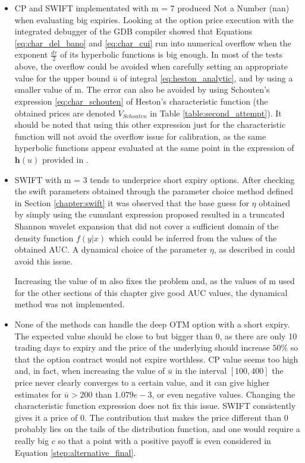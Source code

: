 \documentclass[12,twoside]{mammeTFM}
\theoremstyle{definition}
\theoremstyle{remark}
\begin{document}
\begin{itemize}
\item CP and SWIFT implementated with m = 7 produced Not a Number (nan) when evaluating big expiries. Looking at the option price execution with the integrated debugger of the GDB compiler \cite{wil16} showed that Equations \ref{eq:char_del_bano} and \ref{eq:char_cui} run into numerical overflow when the exponent $\frac{d \tau}{2}$ of its hyperbolic functions is big enough. In most of the tests above, the overflow could be avoided when carefully setting an appropriate value for the upper bound $\overline{u}$ of integral \ref{eq:heston_analytic}, and by using a smaller value of m. The error can also be avoided by using Schouten's expression \ref{eq:char_schouten} of Heston's characteristic function (the obtained prices are denoted $V_{Schouten}$ in Table \ref{table:second_attempt}). It should be noted that using this other expression just for the characteristic function will not avoid the overflow issue for calibration, as the same hyperbolic functions appear evaluated at the same point in the expression of $\boldsymbol{h}(u)$ provided in \cite{cui17}.

\item SWIFT with m = 3 tends to underprice short expiry options. After checking the swift parameters obtained through the parameter choice method defined in Section \ref{chapter:swift} it was observed that the base guess for $\eta$ obtained by simply using the cumulant expression proposed resulted in a truncated Shannon wavelet expansion that did not cover a sufficient domain of the density function $f(y | x)$ which could be inferred from the values of the obtained AUC. A dynamical choice of the parameter $\eta$, as described in \cite{Ortiz-Gracia2016} could avoid this issue.

Increasing the value of m also fixes the problem and, as the values of m used for the other sections of this chapter give good AUC values, the dynamical method was not implemented.

\item None of the methods can handle the deep OTM option with a short expiry. The expected value should be close to but bigger than 0, as there are only 10 trading days to expiry and the price of the underlying should increase $50\%$ so that the option contract would not expire worthless. CP value seems too high and, in fact, when increasing the value of $\overline{u}$ in the interval $[100, 400]$ the price never clearly converges to a certain value, and it can give higher estimates for $\overline{u} > 200$ than $1.079e-3$, or even negative values. Changing the characteristic function expression does not fix this issue. SWIFT consistently gives it a price of 0. The contribution that makes the price different than 0 probably lies on the tails of the distribution function, and one would require a really big $c$ so that a point with a positive payoff is even considered in Equation \ref{step:alternative_final}.
\end{itemize}
\end{document}
